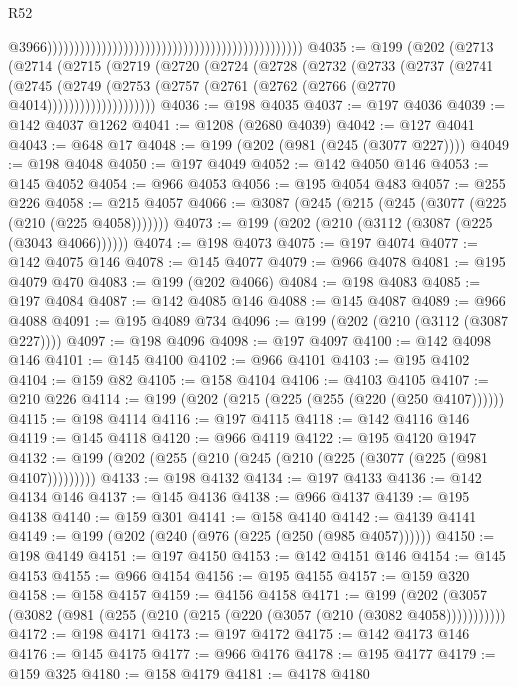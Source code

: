 \begin{lexlean}{R52}
\begin{coremodule}
{{{{{{{{{{{{{{{{{{{{{{{{{{{{{{{{{{{{{{{{{{{{{{{{{{{{{{{{{{{{{{{{{{{{{{{{{{{{{{{{{{{{{{{{{{{{{{{{{{{{{{{{{{{{{{{{{{{{{{{{{{{{{{{{{{{{{{{{{{{{{{{{{{{{{{{{{{{{{{{{{{{{{{{{{{{{{{{{{{{{{{{{{{{{{{{{{{{{{{                                                                                                  @3966)))))))))))))))))))))))))))))))))))))))))))))))
@4035 := @199
    (@202
      (@2713
        (@2714
          (@2715
            (@2719
              (@2720
                (@2724
                  (@2728
                    (@2732
                      (@2733
                        (@2737
                          (@2741
                            (@2745
                              (@2749
                                (@2753 (@2757 (@2761 (@2762 (@2766 (@2770 @4014))))))))))))))))))))
@4036 := @198 @4035
@4037 := @197 @4036
@4039 := @142 @4037 @1262
@4041 := @1208 (@2680 @4039)
@4042 := @127 @4041
@4043 := @648 @17
@4048 := @199 (@202 (@981 (@245 (@3077 @227))))
@4049 := @198 @4048
@4050 := @197 @4049
@4052 := @142 @4050 @146
@4053 := @145 @4052
@4054 := @966 @4053
@4056 := @195 @4054 @483
@4057 := @255 @226
@4058 := @215 @4057
@4066 := @3087 (@245 (@215 (@245 (@3077 (@225 (@210 (@225 @4058)))))))
@4073 := @199 (@202 (@210 (@3112 (@3087 (@225 (@3043 @4066))))))
@4074 := @198 @4073
@4075 := @197 @4074
@4077 := @142 @4075 @146
@4078 := @145 @4077
@4079 := @966 @4078
@4081 := @195 @4079 @470
@4083 := @199 (@202 @4066)
@4084 := @198 @4083
@4085 := @197 @4084
@4087 := @142 @4085 @146
@4088 := @145 @4087
@4089 := @966 @4088
@4091 := @195 @4089 @734
@4096 := @199 (@202 (@210 (@3112 (@3087 @227))))
@4097 := @198 @4096
@4098 := @197 @4097
@4100 := @142 @4098 @146
@4101 := @145 @4100
@4102 := @966 @4101
@4103 := @195 @4102
@4104 := @159 @82
@4105 := @158 @4104
@4106 := @4103 @4105
@4107 := @210 @226
@4114 := @199 (@202 (@215 (@225 (@255 (@220 (@250 @4107))))))
@4115 := @198 @4114
@4116 := @197 @4115
@4118 := @142 @4116 @146
@4119 := @145 @4118
@4120 := @966 @4119
@4122 := @195 @4120 @1947
@4132 := @199 (@202 (@255 (@210 (@245 (@210 (@225 (@3077 (@225 (@981 @4107)))))))))
@4133 := @198 @4132
@4134 := @197 @4133
@4136 := @142 @4134 @146
@4137 := @145 @4136
@4138 := @966 @4137
@4139 := @195 @4138
@4140 := @159 @301
@4141 := @158 @4140
@4142 := @4139 @4141
@4149 := @199 (@202 (@240 (@976 (@225 (@250 (@985 @4057))))))
@4150 := @198 @4149
@4151 := @197 @4150
@4153 := @142 @4151 @146
@4154 := @145 @4153
@4155 := @966 @4154
@4156 := @195 @4155
@4157 := @159 @320
@4158 := @158 @4157
@4159 := @4156 @4158
@4171 := @199 (@202 (@3057 (@3082 (@981 (@255 (@210 (@215 (@220 (@3057 (@210 (@3082 @4058)))))))))))
@4172 := @198 @4171
@4173 := @197 @4172
@4175 := @142 @4173 @146
@4176 := @145 @4175
@4177 := @966 @4176
@4178 := @195 @4177
@4179 := @159 @325
@4180 := @158 @4179
@4181 := @4178 @4180
}}}}}}}}}}}}}}}}}}}}}}}}}}}}}}}}}}}}}}}}}}}}}}}}}}}}}}}}}}}}}}}}}}}}}}}}}}}}}}}}}}}}}}}}}}}}}}}}}}}}}}}}}}}}}}}}}}}}}}}}}}}}}}}}}}}}}}}}}}}}}}}}}}}}}}}}}}}}}}}}}}}}}}}}}}}}}}}}}}}}}}}}}}}}}}}}}}}}}}
\end{coremodule}
\end{lexlean}
